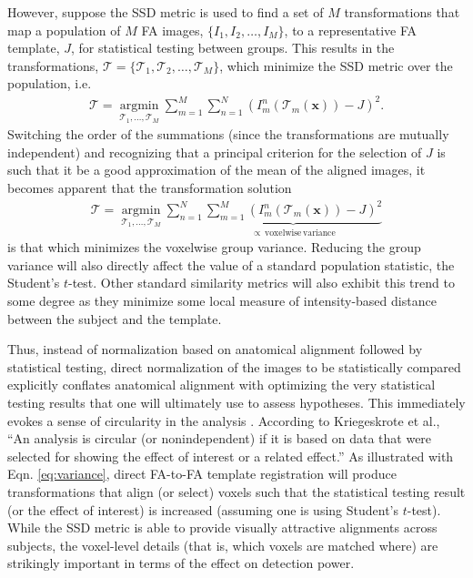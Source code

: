 \documentclass[final,5p,times,twocolumn]{elsarticle}
\begin{document}
However, suppose the SSD metric is used to find a set of $M$ transformations that map a population of $M$ FA images, $\{I_1, I_2, \ldots, I_M\}$, to a representative FA template, $J$, for statistical testing between groups. This results in the transformations,
$\boldsymbol{\mathcal{T}} = \{\mathcal{T}_1, \mathcal{T}_2,\ldots,\mathcal{T}_M \}$, which minimize the SSD metric over the population, i.e.
\begin{align}
  \boldsymbol{\mathcal{T}} = \underset{\mathcal{T}_1, \ldots, \mathcal{T}_M}{\operatorname{argmin}}
    \sum_{m=1}^M\sum_{n=1}^N \left( I^n_m( \mathcal{T}_m(\mathbf{x}) ) - J \right)^2.
\end{align}
Switching the order of the summations (since the transformations are mutually independent) and recognizing that a principal criterion for the selection of $J$ is such that it be a good approximation of the mean of the aligned images, it becomes apparent that the transformation solution
\begin{align}\label{eq:variance}
  \boldsymbol{\mathcal{T}} = \underset{\mathcal{T}_1, \ldots, \mathcal{T}_M}{\operatorname{argmin}}
    \sum_{n=1}^N \underbrace{\sum_{m=1}^M \left( I^n_m( \mathcal{T}_m(\mathbf{x}) ) - J \right)^2}_{
    \propto\mathrm{\,voxelwise\,variance}}
\end{align}
is that which minimizes the voxelwise group variance.  Reducing the group variance will also directly affect the value of a standard population statistic, the Student's $t$-test.  Other standard similarity metrics will also exhibit this
trend to some degree as they minimize some local measure of intensity-based distance between the subject and the template.  

Thus, instead of normalization based on anatomical alignment followed by
statistical testing, direct normalization of the images to be statistically compared 
explicitly conflates
anatomical alignment with optimizing the very statistical testing
results that one will ultimately use to assess hypotheses.  This immediately evokes a sense of circularity in the analysis \citep{Kriegeskorte2010}.
According to Kriegeskrote et al., ``An analysis is circular (or nonindependent) if it is based on data that were selected for showing the effect of interest or a related effect.''  As illustrated with
Eqn. \ref{eq:variance}, direct FA-to-FA template registration will produce transformations that align (or select) voxels such that the statistical testing result (or the effect of interest) is increased (assuming one is using Student's 
$t$-test).  While the SSD metric is able to provide visually attractive alignments across subjects, the voxel-level details (that is, which voxels are matched where) are strikingly important in terms of the effect on detection power.  
\end{document}

